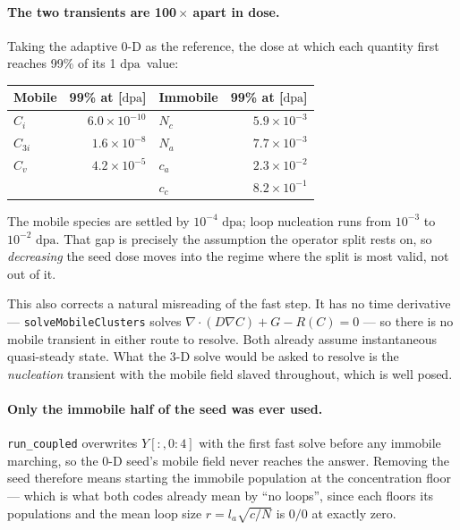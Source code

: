 \documentclass[11pt,a4paper]{article}
\newcommand{\code}[1]{\texttt{\small #1}}
\newcommand{\dpa}{\ensuremath{\mathrm{dpa}}}
\begin{document}
\paragraph{The two transients are 100\,$\times$ apart in dose.} Taking the
adaptive 0-D as the reference, the dose at which each quantity first reaches
99\% of its 1 \dpa\ value:

\begin{center}
\begin{tabular}{lrlr}
\toprule
Mobile & 99\% at [\dpa] & Immobile & 99\% at [\dpa] \\
\midrule
$C_i$   & $6.0\times10^{-10}$ & $N_c$ & $5.9\times10^{-3}$ \\
$C_{3i}$& $1.6\times10^{-8}$  & $N_a$ & $7.7\times10^{-3}$ \\
$C_v$   & $4.2\times10^{-5}$  & $c_a$ & $2.3\times10^{-2}$ \\
        &                     & $c_c$ & $8.2\times10^{-1}$ \\
\bottomrule
\end{tabular}
\end{center}

\noindent
The mobile species are settled by $10^{-4}$ \dpa; loop nucleation runs from
$10^{-3}$ to $10^{-2}$ \dpa. That gap is precisely the assumption the operator
split rests on, so \emph{decreasing} the seed dose moves into the regime where
the split is most valid, not out of it.

This also corrects a natural misreading of the fast step. It has no time
derivative --- \code{solveMobileClusters} solves
$\nabla\!\cdot\!(D\nabla C) + G - R(C) = 0$ --- so there is no mobile transient
in either route to resolve. Both already assume instantaneous quasi-steady
state. What the 3-D solve would be asked to resolve is the \emph{nucleation}
transient with the mobile field slaved throughout, which is well posed.

\paragraph{Only the immobile half of the seed was ever used.} \code{run\_coupled}
overwrites $Y[:,0{:}4]$ with the first fast solve before any immobile marching,
so the 0-D seed's mobile field never reaches the answer. Removing the seed
therefore means starting the immobile population at the concentration floor ---
which is what both codes already mean by ``no loops'', since each floors its
populations and the mean loop size $r=l_a\sqrt{c/N}$ is $0/0$ at exactly zero.
\end{document}
